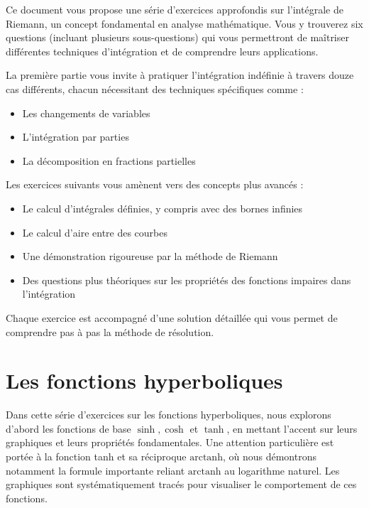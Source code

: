 \documentclass[
  12pt,
  letterpaper,
]{book}
\providecommand{\tightlist}{%
  \setlength{\itemsep}{0pt}\setlength{\parskip}{0pt}}\usepackage{longtable,booktabs,array}
\theoremstyle{remark}
\begin{document}

Ce document vous propose une série d'exercices approfondis sur
l'intégrale de Riemann, un concept fondamental en analyse mathématique.
Vous y trouverez six questions (incluant plusieurs sous-questions) qui
vous permettront de maîtriser différentes techniques d'intégration et de
comprendre leurs applications.

La première partie vous invite à pratiquer l'intégration indéfinie à
travers douze cas différents, chacun nécessitant des techniques
spécifiques comme :

\begin{itemize}
\tightlist
\item
  Les changements de variables
\item
  L'intégration par parties
\item
  La décomposition en fractions partielles
\end{itemize}

Les exercices suivants vous amènent vers des concepts plus avancés :

\begin{itemize}
\tightlist
\item
  Le calcul d'intégrales définies, y compris avec des bornes infinies
\item
  Le calcul d'aire entre des courbes
\item
  Une démonstration rigoureuse par la méthode de Riemann
\item
  Des questions plus théoriques sur les propriétés des fonctions
  impaires dans l'intégration
\end{itemize}

Chaque exercice est accompagné d'une solution détaillée qui vous permet
de comprendre pas à pas la méthode de résolution.

\hypertarget{les-fonctions-hyperboliques}{%
\section*{Les fonctions
hyperboliques}\label{les-fonctions-hyperboliques}}


Dans cette série d'exercices sur les fonctions hyperboliques, nous
explorons d'abord les fonctions de base \(\sinh, \cosh\) et \(\tanh\),
en mettant l'accent sur leurs graphiques et leurs propriétés
fondamentales. Une attention particulière est portée à la fonction tanh
et sa réciproque \(\textrm{arctanh}\), où nous démontrons notamment la
formule importante reliant \(\textrm{arctanh}\) au logarithme naturel.
Les graphiques sont systématiquement tracés pour visualiser le
comportement de ces fonctions.
\end{document}
